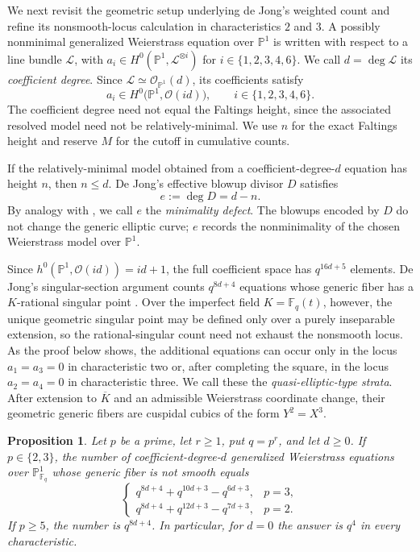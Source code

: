 \documentclass[a4paper,12pt]{amsart}
\newtheorem{prop}[thm]{Proposition}
\theoremstyle{definition}
\newcommand{\Fb}{\mathbb{F}}
\newcommand{\Pb}{\mathbb{P}}
\begin{document}
We next revisit the geometric setup underlying de Jong's weighted count and refine its nonsmooth-locus calculation in characteristics $2$ and $3$. A possibly nonminimal generalized Weierstrass equation over $\Pb^1$ is written with respect to a line bundle $\mathcal L$, with $a_i\in H^0(\Pb^1,\mathcal L^{\otimes i})$ for $i\in\{1,2,3,4,6\}$.  We call $d=\deg\mathcal L$ its \emph{coefficient degree}.  Since $\mathcal L\simeq\mathcal O_{\Pb^1}(d)$, its coefficients satisfy
\[
a_i\in H^0\bigl(\Pb^1,\mathcal O(id)\bigr),
\qquad i\in\{1,2,3,4,6\}.
\]
The coefficient degree need not equal the Faltings height, since the associated resolved model need not be relatively-minimal.  We use $n$ for the exact Faltings height and reserve $M$ for the cutoff in cumulative counts.

If the relatively-minimal model obtained from a coefficient-degree-$d$ equation has height $n$, then $n\leq d$.  De Jong's effective blowup divisor $D$ satisfies
\[
e:=\deg D=d-n.
\]
By analogy with \cite[Definition~4.31]{BPS}, we call $e$ the \emph{minimality defect}.  The blowups encoded by $D$ do not change the generic elliptic curve; $e$ records the nonminimality of the chosen Weierstrass model over $\Pb^1$.

Since $h^0(\Pb^1,\mathcal O(id))=id+1$, the full coefficient space has $q^{16d+5}$ elements.  De Jong's singular-section argument counts $q^{8d+4}$ equations whose generic fiber has a $K$-rational singular point \cite[Section~4.11]{dJ2}.  Over the imperfect field $K=\Fb_q(t)$, however, the unique geometric singular point may be defined only over a purely inseparable extension, so the rational-singular count need not exhaust the nonsmooth locus.  As the proof below shows, the additional equations can occur only in the locus $a_1=a_3=0$ in characteristic two or, after completing the square, in the locus $a_2=a_4=0$ in characteristic three.  We call these the \emph{quasi-elliptic-type strata}.  After extension to $\overline K$ and an admissible Weierstrass coordinate change, their geometric generic fibers are cuspidal cubics of the form $Y^2=X^3$.

\begin{prop}\label{prop:nonsmooth}
Let $p$ be a prime, let $r\geq1$, put $q=p^r$, and let $d\geq0$.  If $p\in\{2,3\}$, the number of coefficient-degree-$d$ generalized Weierstrass equations over $\Pb^1_{\Fb_q}$ whose generic fiber is not smooth equals
\[
\begin{cases}
q^{8d+4}+q^{10d+3}-q^{6d+3},&p=3,\\[1mm]
q^{8d+4}+q^{12d+3}-q^{7d+3},&p=2.
\end{cases}
\]
If $p\geq5$, the number is $q^{8d+4}$.  In particular, for $d=0$ the answer is $q^4$ in every characteristic.
\end{prop}
\end{document}
